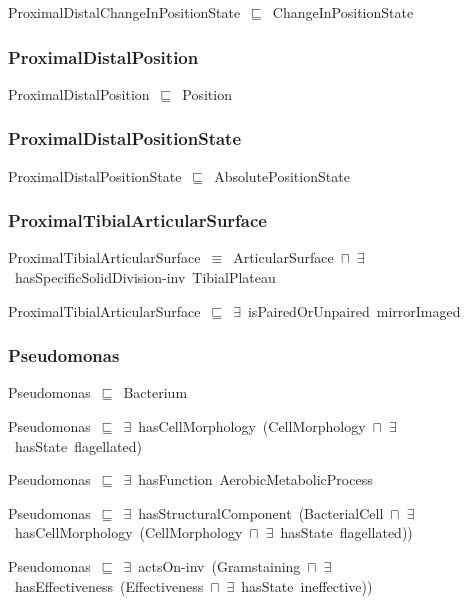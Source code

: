 \documentclass{article}
\begin{document}
ProximalDistalChangeInPositionState~\ensuremath{\sqsubseteq}~ChangeInPositionState~

\subsubsection*{ProximalDistalPosition}

ProximalDistalPosition~\ensuremath{\sqsubseteq}~Position~

\subsubsection*{ProximalDistalPositionState}

ProximalDistalPositionState~\ensuremath{\sqsubseteq}~AbsolutePositionState~

\subsubsection*{ProximalTibialArticularSurface}

ProximalTibialArticularSurface~\ensuremath{\equiv}~ArticularSurface~\ensuremath{\sqcap}~\ensuremath{\exists}~hasSpecificSolidDivision-inv~TibialPlateau

ProximalTibialArticularSurface~\ensuremath{\sqsubseteq}~\ensuremath{\exists}~isPairedOrUnpaired~mirrorImaged~

\subsubsection*{Pseudomonas}

Pseudomonas~\ensuremath{\sqsubseteq}~Bacterium~

Pseudomonas~\ensuremath{\sqsubseteq}~\ensuremath{\exists}~hasCellMorphology~(CellMorphology~\ensuremath{\sqcap}~\ensuremath{\exists}~hasState~flagellated)~

Pseudomonas~\ensuremath{\sqsubseteq}~\ensuremath{\exists}~hasFunction~AerobicMetabolicProcess~

Pseudomonas~\ensuremath{\sqsubseteq}~\ensuremath{\exists}~hasStructuralComponent~(BacterialCell~\ensuremath{\sqcap}~\ensuremath{\exists}~hasCellMorphology~(CellMorphology~\ensuremath{\sqcap}~\ensuremath{\exists}~hasState~flagellated))~

Pseudomonas~\ensuremath{\sqsubseteq}~\ensuremath{\exists}~actsOn-inv~(Gramstaining~\ensuremath{\sqcap}~\ensuremath{\exists}~hasEffectiveness~(Effectiveness~\ensuremath{\sqcap}~\ensuremath{\exists}~hasState~ineffective))~
\end{document}
